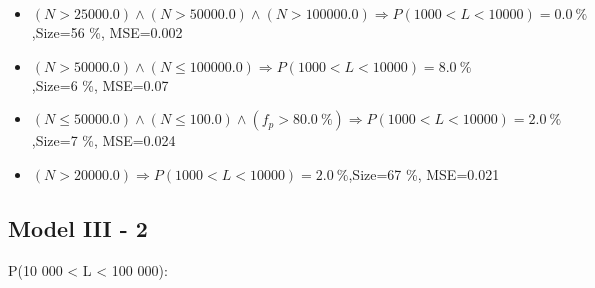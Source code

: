 \documentclass[numbered]{CSL}
\begin{document}
\begin{itemize}
\item $(N > 25000.0) \land (N > 50000.0) \land (N > 100000.0) \Rightarrow P(1 000 < L < 10 000) = 0.0~\%$,\hfill Size=56 \%, MSE=0.002
\item $(N > 50000.0) \land (N \leq 100000.0) \Rightarrow P(1 000 < L < 10 000) = 8.0~\%$,\hfill Size=6 \%, MSE=0.07
\item $(N \leq 50000.0) \land (N \leq 100.0) \land (f_p > 80.0~\%) \Rightarrow P(1 000 < L < 10 000) = 2.0~\%$,\hfill Size=7 \%, MSE=0.024
\item $(N > 20000.0) \Rightarrow P(1 000 < L < 10 000) = 2.0~\%$,\hfill Size=67 \%, MSE=0.021
\end{itemize}

\subsection{Model III - 2}
P(10 000 < L < 100 000):
\end{document}
